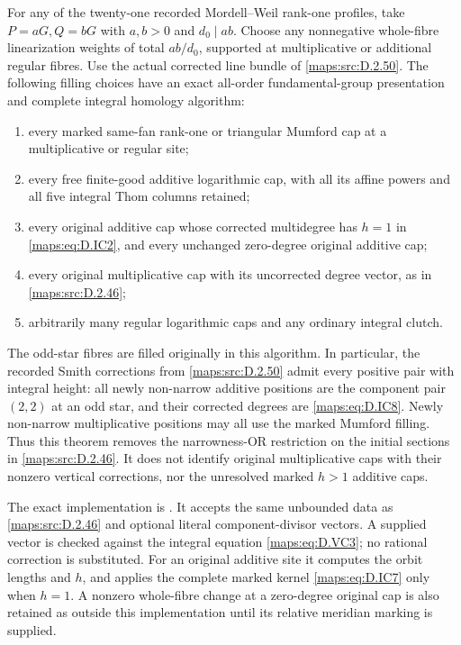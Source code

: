 \begin{theorem}
For any of the twenty-one recorded Mordell--Weil rank-one
profiles, take $P=aG,Q=bG$ with $a,b>0$ and
$d_0\mid ab$. Choose any nonnegative whole-fibre
linearization weights of total $ab/d_0$, supported
at multiplicative or additional regular fibres.
Use the actual corrected line bundle of \ref{maps:src:D.2.50}.
The following filling choices have an exact all-order
fundamental-group presentation and complete integral
homology algorithm:
\begin{enumerate}[label=(\roman*)]
\item every marked same-fan rank-one or triangular
Mumford cap at a multiplicative or regular site;
\item every free finite-good additive logarithmic cap,
with all its affine powers and all five integral Thom
columns retained;
\item every original additive cap whose corrected
multidegree has $h=1$ in \eqref{maps:eq:D.IC2}, and every unchanged
zero-degree original additive cap;
\item every original multiplicative cap with its
uncorrected degree vector, as in \ref{maps:src:D.2.46};
\item arbitrarily many regular logarithmic caps and
any ordinary integral clutch.
\end{enumerate}
The odd-star fibres are filled originally in this
algorithm. In particular, the recorded Smith
corrections from \ref{maps:src:D.2.50} admit every positive pair
with integral height: all newly non-narrow additive
positions are the component pair $(2,2)$ at an odd
star, and their corrected degrees are \eqref{maps:eq:D.IC8}.
Newly non-narrow multiplicative positions may all
use the marked Mumford filling.
Thus this theorem removes the narrowness-OR restriction
on the initial sections in \ref{maps:src:D.2.46}.
It does not identify original multiplicative caps
with their nonzero vertical corrections, nor the
unresolved marked $h>1$ additive caps.

The exact implementation is
.
It accepts the same unbounded data as \ref{maps:src:D.2.46} and
optional literal component-divisor vectors. A supplied
vector is checked against the integral equation
\eqref{maps:eq:D.VC3}; no rational correction is substituted.
For an original additive site it computes the
orbit lengths and $h$, and applies the complete
marked kernel \eqref{maps:eq:D.IC7} only when $h=1$.
A nonzero whole-fibre change at a zero-degree
original cap is also retained as outside this
implementation until its relative meridian marking
is supplied.

\end{theorem}


